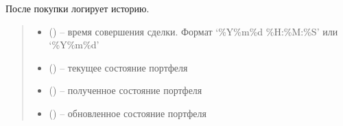 \documentclass[letterpaper,10pt,english,openany,oneside]{sphinxmanual}
\begin{document}
\begin{fulllineitems}
\begin{fulllineitems}
\label{\detokenize{src.structures:src.structures.st_portfolio.Portfolio.history}}
\pysigstartsignatures
{}
\pysigstopsignatures
\end{fulllineitems}


\begin{fulllineitems}
\label{\detokenize{src.structures:src.structures.st_portfolio.Portfolio.log_history}}
\pysigstartsignatures
{}
\pysigstopsignatures
\sphinxAtStartPar
После покупки логирует историю.
\begin{quote}\begin{description}
\begin{itemize}
\item {} 
\sphinxAtStartPar
{} () – время совершения сделки. Формат ‘\%Y\sphinxhyphen{}\%m\sphinxhyphen{}\%d \%H:\%M:\%S’ или ‘\%Y\sphinxhyphen{}\%m\sphinxhyphen{}\%d’

\item {} 
\sphinxAtStartPar
{} ({\hyperref[\detokenize{src.structures:src.structures.st_portfolio.Securities}]{}}) – текущее состояние портфеля

\item {} 
\sphinxAtStartPar
{} ({\hyperref[\detokenize{src.structures:src.structures.st_portfolio.Securities}]{}}) – полученное состояние портфеля

\item {} 
\sphinxAtStartPar
{} ({\hyperref[\detokenize{src.structures:src.structures.st_portfolio.Securities}]{}}) – обновленное состояние портфеля


\end{itemize}
\end{description}
\end{quote}
\end{fulllineitems}
\end{fulllineitems}
\end{document}
